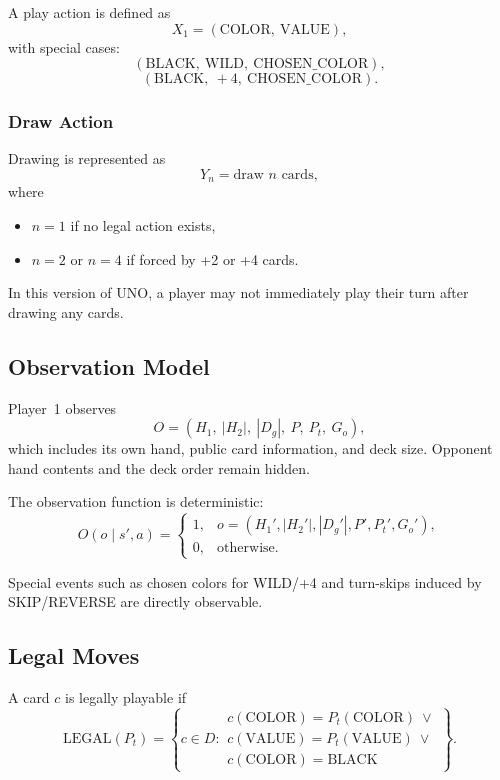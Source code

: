 \documentclass[journal,transmag]{IEEEtran}
\begin{document}
A play action is defined as
\[
X_1 = (\text{COLOR},\ \text{VALUE}),
\]
with special cases:
\[
(\text{BLACK},\ \text{WILD},\ \text{CHOSEN\_COLOR}),
\]
\[
(\text{BLACK},\ +4,\ \text{CHOSEN\_COLOR}).
\]

\subsubsection{Draw Action}

Drawing is represented as
\[
Y_n = \text{draw } n \text{ cards},
\]
where
\begin{itemize}
    \item $n = 1$ if no legal action exists,
    \item $n = 2$ or $n = 4$ if forced by +2 or +4 cards.
\end{itemize}


In this version of UNO, a player may not immediately play their turn after drawing any cards.

\subsection{Observation Model}

Player~1 observes
\[
O = (H_1,\ |H_2|,\ |D_g|,\ P,\ P_t,\ G_o),
\]
which includes its own hand, public card information, and deck size.
Opponent hand contents and the deck order remain hidden.

The observation function is deterministic:
\[
O(o \mid s', a) =
\begin{cases}
1, & o = (H_1', |H_2'|, |D_g'|, P', P_t', G_o'), \\
0, & \text{otherwise}.
\end{cases}
\]

Special events such as chosen colors for WILD/+4 and turn-skips induced
by SKIP/REVERSE are directly observable.

\subsection{Legal Moves}

A card $c$ is legally playable if
\[
\text{LEGAL}(P_t)
=
\left\{
c \in D :
\begin{array}{l}
c(\text{COLOR}) = P_t(\text{COLOR})\ \lor\\
c(\text{VALUE}) = P_t(\text{VALUE})\ \lor\\
c(\text{COLOR}) = \text{BLACK}
\end{array}
\right\}.
\]
\end{document}
